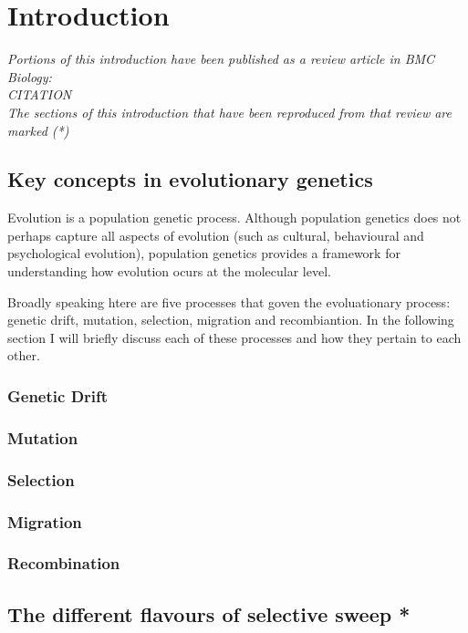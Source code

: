 \chapter{Introduction}
\linespread{2}


\emph{Portions of this introduction have been published as a review article in BMC Biology: \\CITATION\\The sections of this introduction that have been reproduced from that review are marked (*)}

\section[Key concepts]{Key concepts in evolutionary genetics}

Evolution is a population genetic process. Although population genetics does not perhaps capture all aspects of evolution (such as cultural, behavioural and psychological evolution), population genetics provides a framework for understanding how evolution ocurs at the molecular level.

Broadly speaking htere are five processes that goven the evoluationary process: genetic drift, mutation, selection, migration and recombiantion. In the following section I will briefly discuss each of these processes and how they pertain to each other.

\subsection{Genetic Drift}
\subsection{Mutation}
\subsection{Selection}
\subsection{Migration}
\subsection{Recombination}

\section[Selective sweep models]{The different flavours of selective sweep *}

